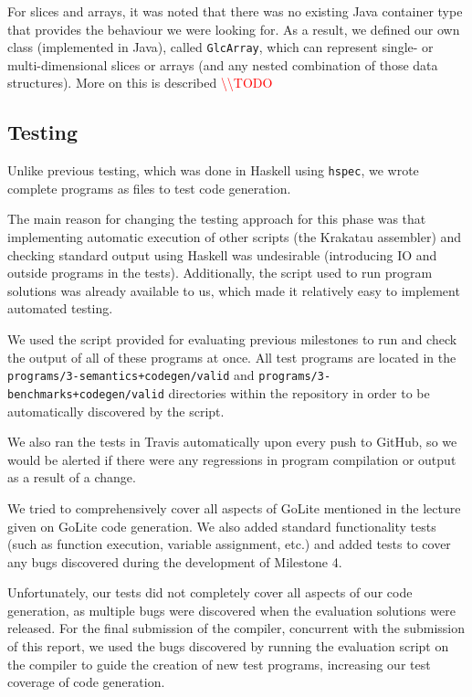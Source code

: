 \documentclass[11pt]{article}
\newcommand{\todo}[0]{\textcolor{red}{\textbackslash\textbackslash TODO \ }}
\begin{document}
For slices and arrays, it was noted that there was no existing Java container type
that provides the behaviour we were looking for. As a result, we defined our own
class (implemented in Java), called \texttt{GlcArray}, which can represent single-
or multi-dimensional slices or arrays (and any nested combination of those data structures).
More on this is described \todo %


\subsection{Testing}
Unlike previous testing, which was done in Haskell using \texttt{hspec}, we
wrote complete programs as files to test code generation.

The main reason for changing the testing approach for this phase was
that
implementing automatic execution of other scripts (the Krakatau assembler) and
checking standard output using Haskell was undesirable (introducing IO
and outside programs in the tests). Additionally, the script used to run
program solutions was already available to us, which made it relatively easy
to implement automated testing.

We used the script provided for evaluating previous milestones to run and check
the output of all of these programs at once. All test programs are located
in the \texttt{programs/3-semantics+codegen/valid} and
\texttt{programs/3-benchmarks+codegen/valid} directories within the repository
in order to be automatically discovered by the script.

We also ran the tests in Travis automatically upon every push to GitHub,
so we would be alerted if there were any regressions in program compilation
or output as a result of a change.

We tried to comprehensively cover all aspects of GoLite mentioned in the
lecture given on GoLite code generation. We also added standard functionality
tests (such as function execution, variable assignment, etc.) and added tests
to cover any bugs discovered during the development of Milestone 4.

Unfortunately, our tests did not completely cover all aspects of our code
generation, as multiple bugs were discovered when the evaluation solutions
were released. For the final submission of the compiler, concurrent with the
submission of this report, we used the bugs discovered by running the evaluation
script on the compiler to guide the creation of new test programs, increasing our
test coverage of code generation.
\end{document}
